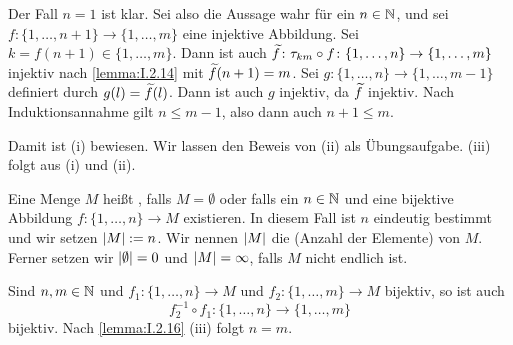 \begin{beweis}
	Der Fall $n=1$ ist klar.
	Sei also die Aussage wahr für ein $n \in \mathbb{N}$, und sei $f\colon \{1, \dots, n+1\} \rightarrow \{1,\dots,m\}$ eine injektive Abbildung.
	Sei $k = f(n+1) \in \{1,\dots,m\}$.
	Dann ist auch $\widetilde{f}\colon \tau_{km} \circ f \colon \{1,\dots,n\} \rightarrow \{1,\dots,m\}$ injektiv nach \autoref{lemma:I.2.14} mit $\widetilde{f}(n+1)=m$.
	Sei $g \colon \{1,\dots,n\} \rightarrow \{1,\dots,m-1\}$ definiert durch $g(l) = \widetilde{f}(l)$.
	Dann ist auch $g$ injektiv, da $\widetilde{f}$ injektiv.
	Nach Induktionsannahme gilt $n \leq m-1$, also dann auch $n+1 \leq m$.
	
	Damit ist (i) bewiesen.
	Wir lassen den Beweis von (ii) als Übungsaufgabe.
	(iii) folgt aus (i) und (ii).
\end{beweis}

\begin{definition}
	\label{def:I.2.17}
	Eine Menge $M$ heißt , falls $M = \emptyset$ oder falls ein $n \in \mathbb{N}$ und eine bijektive Abbildung $f \colon \{1,\dots,n\} \rightarrow M$ existieren.
	In diesem Fall ist $n$ eindeutig bestimmt und wir setzen $\left\lvert M\right\rvert := n$.
	Wir nennen $\left\lvert M\right\rvert$ die  (Anzahl der Elemente) von $M$.
	Ferner setzen wir $\left\lvert\emptyset\right\rvert = 0$ und $\left\lvert M\right\rvert = \infty$, falls $M$ nicht endlich ist.
\end{definition}

\begin{beweis}
	Sind $n,m \in \mathbb{N}$ und $f_1\colon \{1,\dots,n\} \rightarrow M$ und $f_2 \colon \{1,\dots,m\} \rightarrow M$ bijektiv, so ist auch
	\[
		f_2^{-1} \circ f_1 \colon \{1,\dots,n\} \rightarrow \{1,\dots,m\}
	\]
	bijektiv.
	Nach \autoref{lemma:I.2.16} (iii) folgt $n = m$.
\end{beweis} 
\cleardoubleoddemptypage